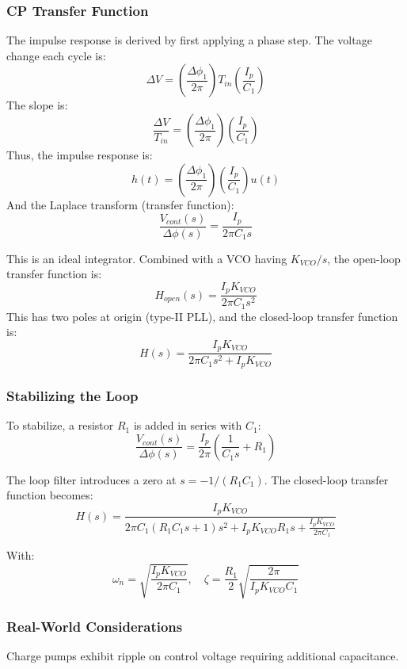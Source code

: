 \subsubsection{CP Transfer Function}
The impulse response is derived by first applying a phase step. The voltage change each cycle is:
\[
\Delta V = \left(\frac{\Delta \phi_1}{2\pi}\right)T_{in}\left(\frac{I_p}{C_1}\right)
\]
The slope is:
\[
\frac{\Delta V}{T_{in}} = \left(\frac{\Delta \phi_1}{2\pi}\right)\left(\frac{I_p}{C_1}\right)
\]
Thus, the impulse response is:
\[
h(t) = \left(\frac{\Delta \phi_1}{2\pi}\right)\left(\frac{I_p}{C_1}\right)u(t)
\]
And the Laplace transform (transfer function):
\[
\frac{V_{cont}(s)}{\Delta \phi(s)} = \frac{I_p}{2\pi C_1 s}
\]


This is an ideal integrator. Combined with a VCO having $K_{VCO}/s$, the open-loop transfer function is:
\[
H_{open}(s) = \frac{I_p K_{VCO}}{2\pi C_1 s^2}
\]
This has two poles at origin (type-II PLL), and the closed-loop transfer function is:
\[
H(s) = \frac{I_p K_{VCO}}{2\pi C_1 s^2 + I_p K_{VCO}}
\]

\subsubsection{Stabilizing the Loop}
To stabilize, a resistor $R_1$ is added in series with $C_1$:
\[
\frac{V_{cont}(s)}{\Delta \phi(s)} = \frac{I_p}{2\pi} \left( \frac{1}{C_1 s} + R_1 \right)
\]


The loop filter introduces a zero at $s = -1/(R_1 C_1)$. The closed-loop transfer function becomes:
\[
H(s) = \frac{I_p K_{VCO}}{2\pi C_1 (R_1 C_1 s + 1) s^2 + I_p K_{VCO} R_1 s + \frac{I_p K_{VCO}}{2\pi C_1}}
\]

With:
\[
\omega_n = \sqrt{\frac{I_p K_{VCO}}{2\pi C_1}}, \quad \zeta = \frac{R_1}{2} \sqrt{\frac{2\pi}{I_p K_{VCO} C_1}}
\]

\subsubsection{Real-World Considerations}
Charge pumps exhibit ripple on control voltage requiring additional capacitance.

